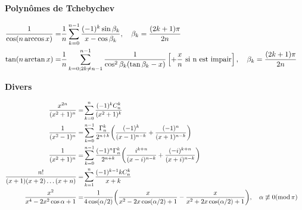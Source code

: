 {{\bigskip

\textbf{Polyn{\^o}mes de Tchebychev}

\begin{align*}
\FFF 1/{\cos(n\arccos x)}  =& \FFF1/n \sum_{k=0}^{n-1} \FFF (-1)^k\sin\beta_k/x-\cos\beta_k ,\quad \beta_k = \FFF(2k+1)\pi/2n \cr
\tan(n\arctan x)         =& \FFF1/n \sum_{k=0 ; 2k\ne n-1}^{n-1} \FFF1/\cos^2\beta_k(\tan\beta_k-x)
                              \left[ + \FFF x/n \ \text{si n est impair} \right],\quad \beta_k = \FFF(2k+1)\pi/2n \cr
\end{align*}

\bigskip

\textbf{Divers}

\begin{align*}
\FFF x^{2n}/{\CCC n}  =& \sum_{k=0}^n \FFF (-1)^kC_n^k/{\CCC k} \cr
\FFF 1/(x^2-1)^n    =& \sum_{k=0}^{n-1} \FFF \Gamma_n^k/2^{n+k} \biggl( \FFF (-1)^k/(x-1)^{n-k} + \FFF (-1)^n/(x+1)^{n-k} \biggr) \cr
\FFF 1/{\CCC n}      = & \sum_{k=0}^{n-1} \FFF (-1)^n\Gamma_n^k/2^{n+k} \biggl( \FFF {i^{k+n}}/(x-i)^{n-k} + \FFF {(-i)^{k+n}}/(x+i)^{n-k} \biggr) \cr
\FFF n!/(x+1)(x+2)\dots(x+n)  =& \sum_{k=1}^n \FFF (-1)^{k-1}kC_n^k/x+k \cr
\FFF x^2/x^4-2x^2\cos\alpha+1 =& \FFF1/4\cos(\alpha/2) \biggl(\FFF x/x^2-2x\cos(\alpha/2)+1 - \FFF x/x^2+2x\cos(\alpha/2)+1 \biggr), \quad \alpha\not\equiv0(\mathrm{mod}\,\pi)\cr
\end{align*}
}
}
